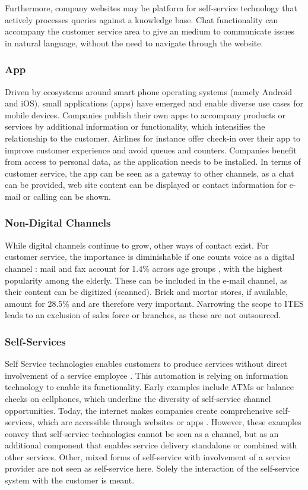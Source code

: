 		Furthermore, company websites may be platform for self-service technology that actively processes queries against a knowledge base. Chat functionality can accompany the customer service area to give an medium to communicate issues in natural language, without the need to navigate through the website. 
			
		\subsubsection{App}
		Driven by ecosystems around smart phone operating systems (namely Android and iOS), small applications (apps) have emerged and enable diverse use cases for mobile devices. Companies publish their own apps to accompany products or services by additional information or functionality, which intensifies the relationship to the customer. Airlines for instance offer check-in over their app to improve customer experience and avoid queues and counters. Companies benefit from access to personal data, as the application needs to be installed. In terms of customer service, the app can be seen as a gateway to other channels, as a chat can be provided, web site content can be displayed or contact information for e-mail or calling can be shown. 
		
		\subsubsection{Non-Digital Channels}
		While digital channels continue to grow, other ways of contact exist. For customer service, the importance is diminishable if one counts voice as a digital channel : mail and fax account for 1.4\% across age groups \citep{Agnischock2015}, with the highest popularity among the elderly. These can be included in the e-mail channel, as their content can be digitized (\viz scanned). Brick and mortar stores, if available, amount for 28.5\% and are therefore very important. Narrowing the scope to \acrshort{ITES} leads to an exclusion of sales force or branches, as these are not outsourced. 
		
	
	\subsubsection{Self-Services}
	\label{sec:ss}
		Self Service technologies enables customers to produce services without direct involvement of a service employee \citep{meuter2000self}. This automation is relying on information technology to enable its functionality. Early examples include ATMs or balance checks on cellphones, which underline the diversity of self-service channel opportunities. Today, the internet makes companies create comprehensive self-services, which are accessible through websites or apps . However, these examples convey that self-service technologies cannot be seen as a channel, but as an additional component that enables service delivery standalone or combined with other services. Other, mixed forms of self-service with involvement of a service provider \citep{Globerson_1991} are not seen as self-service here. Solely the interaction of the self-service system with the customer is meant. 
		
